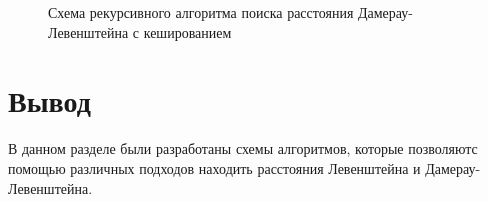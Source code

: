 \begin{figure}[h!]
	
		
		\caption{Схема рекурсивного алгоритма поиска расстояния Дамерау-Левенштейна с кешированием}
		
		\label{fig:dleven_rec_cash3}
		
	\end{figure}

\FloatBarrier
\section*{Вывод}


В данном разделе были разработаны схемы алгоритмов, которые позволяютс помощью различных подходов находить расстояния Левенштейна и Дамерау-Левенштейна.

